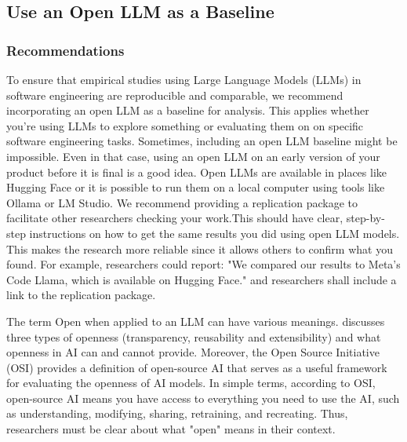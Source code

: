 



\subsection{Use an Open LLM as a Baseline}

\subsubsection{Recommendations}

To ensure that empirical studies using Large Language Models (LLMs) in software engineering are reproducible and comparable, 
we recommend incorporating an open LLM as a baseline for analysis. This applies whether you're using LLMs to explore something or evaluating them
on on specific software engineering tasks. 
Sometimes, including an open LLM baseline might be impossible. 
Even in that case, using an open LLM on an early version of your product before it is final is a good idea.
Open LLMs are available in places like Hugging Face or it is possible to run them on a local computer using tools like Ollama or LM Studio. 
We recommend providing a replication package to facilitate other researchers checking your work.This should have clear, step-by-step instructions on how to get the same results you did using open LLM models. This makes the research more reliable since it allows others to confirm what you found.
For example, researchers could report: "We compared our results to Meta's Code Llama, which is available on Hugging Face." and researchers shall include a link to the replication package.

The term Open when applied to an LLM can have various meanings. \cite{widder2024open} discusses three types of openness (transparency, reusability 
and extensibility) and  what openness in AI can and cannot provide. Moreover, the Open Source Initiative (OSI) \cite{OSIAI2024} provides a definition of 
open-source AI that serves as a useful framework for evaluating the openness of AI models. In simple terms, according to OSI, open-source AI means 
you have access to everything you need to use the AI, such as understanding, modifying, sharing, retraining, and recreating. Thus, researchers must 
be clear about what "open" means in their context.

